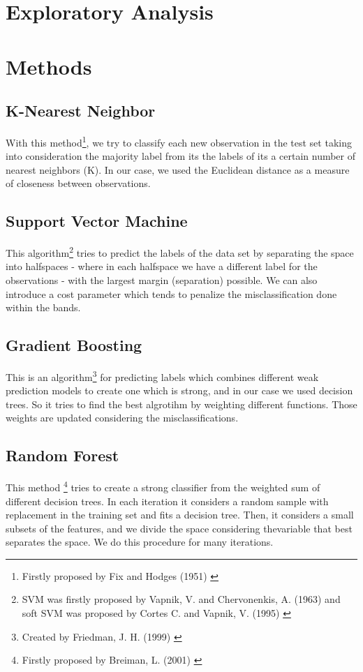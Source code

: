 \documentclass[paper=a4, fontsize=11pt]{scrartcl}
\numberwithin{equation}{section}
\numberwithin{figure}{section}
\numberwithin{table}{section}
\begin{document}

\section{Exploratory Analysis}





\section{Methods}
\subsection{K-Nearest Neighbor}
With this method\footnote{Firstly proposed by Fix and Hodges (1951) \cite{knn}}, we try to classify each new observation in the test set taking into consideration the majority label from its the labels of its a certain number of nearest neighbors (K). In our case, we used the Euclidean distance as a measure of closeness between observations.


\subsection{Support Vector Machine}
This algorithm\footnote{ SVM was firstly proposed by  Vapnik, V. and Chervonenkis, A. (1963) and soft SVM was proposed by  Cortes C. and Vapnik, V. (1995) \cite{vap}}  tries to predict the labels of the data set by separating the space into halfspaces - where in each halfspace we have a different label for the observations - with the largest margin (separation) possible. We can also introduce a cost parameter which tends to penalize the misclassification done within the bands. 

\subsection{Gradient Boosting}
This is an algorithm\footnote{Created by Friedman, J. H. (1999) \cite{Friedman00greedyfunction}} for predicting labels which combines different weak prediction models to create one which is strong, and in our case we used decision trees. So it tries to find the best algrotihm by weighting different functions. Those weights are updated considering the misclassifications. 

\subsection{Random Forest}
This method \footnote{Firstly proposed by Breiman, L. (2001) \cite{random} } tries to create a strong classifier from the weighted sum of different decision trees. In each iteration it considers a random sample with replacement in the training set and fits a decision tree. Then, it considers a small subsets of the features, and we divide the space considering thevariable that best separates the space. We do this procedure for many iterations. 
\end{document}
